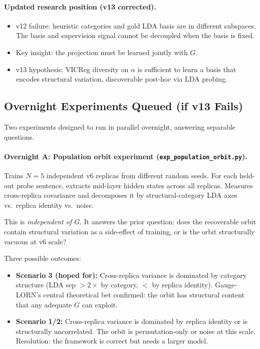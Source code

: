 \documentclass[11pt, a4paper]{article}
\theoremstyle{plain}
\theoremstyle{definition}
\theoremstyle{remark}
\begin{document}
\paragraph{Updated research position (v13 corrected).}
\begin{itemize}[nosep]
\item v12 failure: heuristic categories and gold LDA basis are in different subspaces.
      The basis and supervision signal cannot be decoupled when the basis is fixed.
\item Key insight: the projection must be learned jointly with $G$.
\item v13 hypothesis: VICReg diversity on $\alpha$ is sufficient to learn a basis
      that encodes structural variation, discoverable post-hoc via LDA probing.
\end{itemize}

\subsection{Overnight Experiments Queued (if v13 Fails)}
\label{sec:overnight-queue}

Two experiments designed to run in parallel overnight, answering separable questions.

\paragraph{Overnight A: Population orbit experiment (\texttt{exp\_population\_orbit.py}).}
Trains $N=5$ independent v6 replicas from different random seeds.
For each held-out probe sentence, extracts mid-layer hidden states across all replicas.
Measures cross-replica covariance and decomposes it by structural-category LDA axes vs.\ replica identity vs.\ noise.

This is \emph{independent of $G$}.
It answers the prior question: does the recoverable orbit contain structural variation
as a side-effect of training, or is the orbit structurally vacuous at v6 scale?

Three possible outcomes:
\begin{itemize}[nosep]
\item \textbf{Scenario 3 (hoped for):} Cross-replica variance is dominated by category
      structure (LDA sep $> 2\times$ by category, $<$ by replica identity).
      Gauge-LORN's central theoretical bet confirmed: the orbit has structural content
      that any adequate $G$ can exploit.
\item \textbf{Scenario 1/2:} Cross-replica variance is dominated by replica identity
      or is structurally uncorrelated. The orbit is permutation-only or noise at this scale.
      Resolution: the framework is correct but needs a larger model.
\end{itemize}
\end{document}
